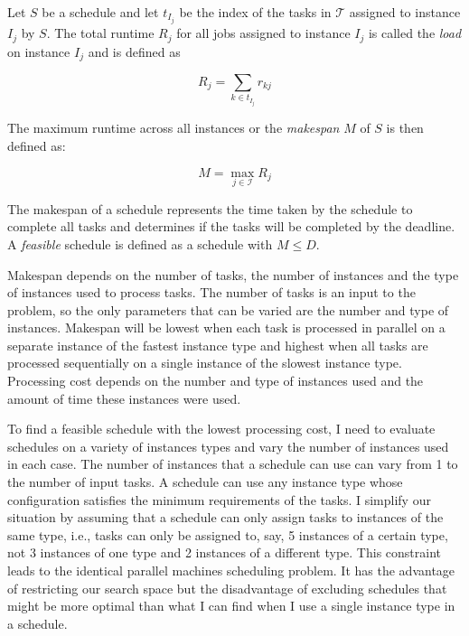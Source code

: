 \documentclass[12pt]{report}
\begin{document}
Let $S$ be a schedule and let $t_{I_j}$ be the index of the tasks in $\mathcal{T}$ assigned to instance $I_j$ by $S$.
The total runtime $R_j$ for all jobs assigned to instance $I_j$ is called the  \textit{load} on instance $I_j$ and is defined as

\begin{equation}
\label{eq:def:load}
R_j = \sum_{k \in t_{I_j}} r_{kj}
\end{equation}

The maximum runtime across all instances or the \textit{makespan} $M$ of $S$ is then defined as:

\begin{equation}
\label{eq:def:makespan}
M = \max_{j \in \mathcal{I}} {R_j}
\end{equation}

The makespan of a schedule represents the time taken by the schedule to complete all tasks and determines if the tasks will be completed by the deadline.
A \textit{feasible} schedule is defined as a schedule with $M \le D$.

Makespan depends on the number of tasks, the number of instances and the type of instances used to process tasks.
The number of tasks is an input to the problem, so the only parameters that can be varied are the number and type of instances.
Makespan will be lowest when each task is processed in parallel on a separate instance of the fastest instance type and highest when all tasks are processed sequentially on a single instance of the slowest instance type.
Processing cost depends on the number and type of instances used and the amount of time these instances were used.

To find a feasible schedule with the lowest processing cost, I need to evaluate schedules on a variety of instances types and vary the number of instances used in each case.
The number of instances that a schedule can use can vary from 1 to the number of input tasks.
A schedule can use any instance type whose configuration satisfies the minimum requirements of the tasks.
I simplify our situation by assuming that a schedule can only assign tasks to instances of the same type, i.e., tasks can only be assigned to, say, 5 instances of a certain type, not 3 instances of one type and 2 instances of a different type.
This constraint leads to the identical parallel machines scheduling problem.
It has the advantage of restricting our search space but the disadvantage of excluding schedules that might be more optimal than what I can find when I use a single instance type in a schedule.
\end{document}
